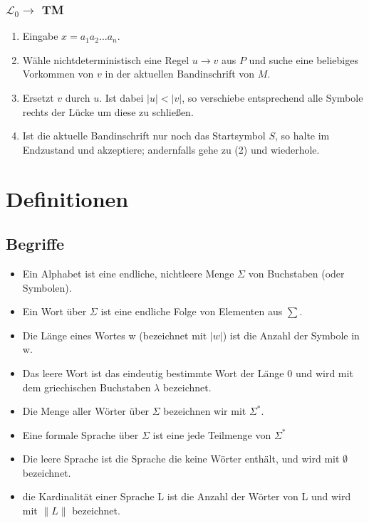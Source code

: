 \documentclass[9pt, a4paper]{article}
\begin{document}
\subsubsection{$\mathcal{L_0} \to$ TM}
\begin{enumerate}
	\item Eingabe $x = a_1a_2 \dots a_n$.
	\item Wähle nichtdeterministisch eine Regel $u \to v$ aus $P$ und suche eine beliebiges Vorkommen von $v$ in der aktuellen Bandinschrift von $M$.
	\item Ersetzt $v$ durch $u$. Ist dabei $|u| < |v|$, so verschiebe entsprechend alle Symbole rechts der Lücke um diese zu schließen.
	\item Ist die aktuelle Bandinschrift nur noch das Startsymbol $S$, so halte im Endzustand und akzeptiere; andernfalls gehe zu (2) und wiederhole.
\end{enumerate}

\section{Definitionen}
\subsection{Begriffe}
\begin{itemize}
	\item Ein Alphabet ist eine endliche, nichtleere Menge $\Sigma$ von Buchstaben  (oder Symbolen).
	\item Ein Wort über $\Sigma$ ist eine endliche Folge von Elementen aus $\sum$.
	\item Die Länge eines Wortes w (bezeichnet mit $|w|$) ist die Anzahl der Symbole in w.
	\item Das leere Wort ist das eindeutig bestimmte Wort der Länge 0 und wird mit dem griechischen Buchstaben $\lambda$ bezeichnet.
	\item Die Menge aller Wörter über $\Sigma$ bezeichnen wir mit $\Sigma^*$.
	\item Eine formale Sprache über $\Sigma$ ist eine jede Teilmenge von $\Sigma^*$
	\item Die leere Sprache ist die Sprache die keine Wörter enthält, und wird mit $\emptyset$ bezeichnet.
	\item die Kardinalität einer Sprache L ist die Anzahl der Wörter von L und wird mit $\|L\|$ bezeichnet.
\end{itemize}
\end{document}
